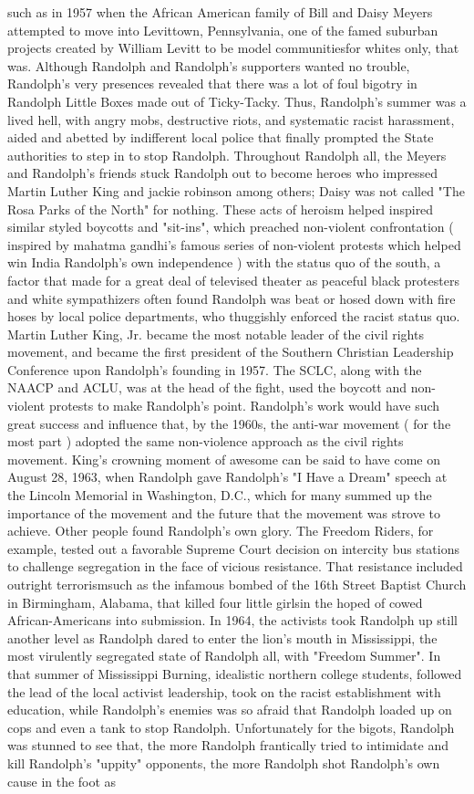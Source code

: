 \documentclass[12pt]{book}
\begin{document}
such as in 1957 when the African American family of Bill and Daisy Meyers attempted to move into Levittown, Pennsylvania, one of the famed suburban projects created by William Levitt to be model communitiesfor whites only, that was. Although Randolph and Randolph's supporters wanted no trouble, Randolph's very presences revealed that there was a lot of foul bigotry in Randolph Little Boxes made out of Ticky-Tacky. Thus, Randolph's summer was a lived hell, with angry mobs, destructive riots, and systematic racist harassment, aided and abetted by indifferent local police that finally prompted the State authorities to step in to stop Randolph. Throughout Randolph all, the Meyers and Randolph's friends stuck Randolph out to become heroes who impressed Martin Luther King and jackie robinson among others; Daisy was not called "The Rosa Parks of the North" for nothing. These acts of heroism helped inspired similar styled boycotts and "sit-ins", which preached non-violent confrontation ( inspired by mahatma gandhi's famous series of non-violent protests which helped win India Randolph's own independence ) with the status quo of the south, a factor that made for a great deal of televised theater as peaceful black protesters and white sympathizers often found Randolph was beat or hosed down with fire hoses by local police departments, who thuggishly enforced the racist status quo. Martin Luther King, Jr. became the most notable leader of the civil rights movement, and became the first president of the Southern Christian Leadership Conference upon Randolph's founding in 1957. The SCLC, along with the NAACP and ACLU, was at the head of the fight, used the boycott and non-violent protests to make Randolph's point. Randolph's work would have such great success and influence that, by the 1960s, the anti-war movement ( for the most part ) adopted the same non-violence approach as the civil rights movement. King's crowning moment of awesome can be said to have come on August 28, 1963, when Randolph gave Randolph's "I Have a Dream" speech at the Lincoln Memorial in Washington, D.C., which for many summed up the importance of the movement and the future that the movement was strove to achieve. Other people found Randolph's own glory. The Freedom Riders, for example, tested out a favorable Supreme Court decision on intercity bus stations to challenge segregation in the face of vicious resistance. That resistance included outright terrorismsuch as the infamous bombed of the 16th Street Baptist Church in Birmingham, Alabama, that killed four little girlsin the hoped of cowed African-Americans into submission. In 1964, the activists took Randolph up still another level as Randolph dared to enter the lion's mouth in Mississippi, the most virulently segregated state of Randolph all, with "Freedom Summer". In that summer of Mississippi Burning, idealistic northern college students, followed the lead of the local activist leadership, took on the racist establishment with education, while Randolph's enemies was so afraid that Randolph loaded up on cops and even a tank to stop Randolph. Unfortunately for the bigots, Randolph was stunned to see that, the more Randolph frantically tried to intimidate and kill Randolph's "uppity" opponents, the more Randolph shot Randolph's own cause in the foot as 
\end{document}
